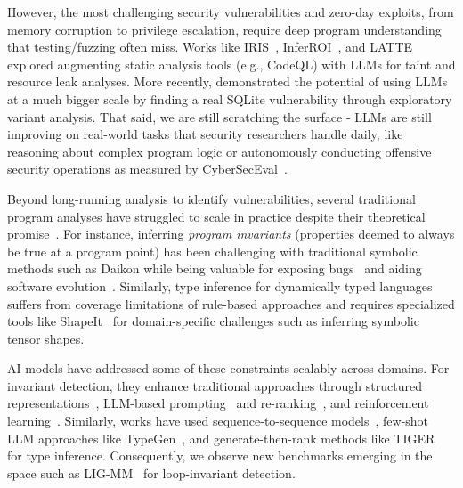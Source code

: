 However, the most challenging security vulnerabilities and zero-day exploits, from memory corruption to privilege escalation, require deep program understanding that testing/fuzzing often miss.
% 
Works like IRIS~\citep{li2024llm}, InferROI~\citep{wang2023boosting}, and LATTE~\citep{liu2023harnessing} explored augmenting static analysis tools (e.g., CodeQL) with LLMs for taint and resource leak analyses.
% 
More recently, \citet{bigsleep} demonstrated the potential of using LLMs at a much bigger scale by finding a real SQLite vulnerability through exploratory variant analysis. That said, we are still scratching the surface - LLMs are still improving on real-world tasks that security researchers handle daily, like reasoning about complex program logic or autonomously conducting offensive security operations as measured by CyberSecEval~\citep{wan2024cyberseceval}.


Beyond long-running analysis to identify vulnerabilities, several traditional program analyses have struggled to scale in practice despite their theoretical promise~\cite{X}. For instance, inferring \textit{program invariants} (properties deemed to always be true at a program point) has been challenging with traditional symbolic methods such as Daikon \citep{ernst2007daikon, padon2016decidability} while being valuable for exposing bugs~\citep{hangal2002tracking} and aiding software evolution~\citep{ernst1999dynamically}. Similarly, type inference for dynamically typed languages suffers from coverage limitations of rule-based approaches and requires specialized tools like ShapeIt~\citep{zheng2024dynamic} for domain-specific challenges such as inferring symbolic tensor shapes.

AI models have addressed some of these constraints scalably across domains. For invariant detection, they enhance traditional approaches through structured representations~\citep{si2018learning}, LLM-based prompting~\citep{kamath2023finding} and re-ranking~\citep{chakraborty2023ranking}, and reinforcement learning~\citep{yu2023loop}. Similarly, works have used sequence-to-sequence models~\citep{wei2023typet5}, few-shot LLM approaches like TypeGen~\citep{peng2023generative}, and generate-then-rank methods like TIGER~\citep{wang2024tiger} for type inference.
% 
Consequently, we observe new benchmarks emerging in the space such as LIG-MM~\citep{liu2024towards} for loop-invariant detection. 


